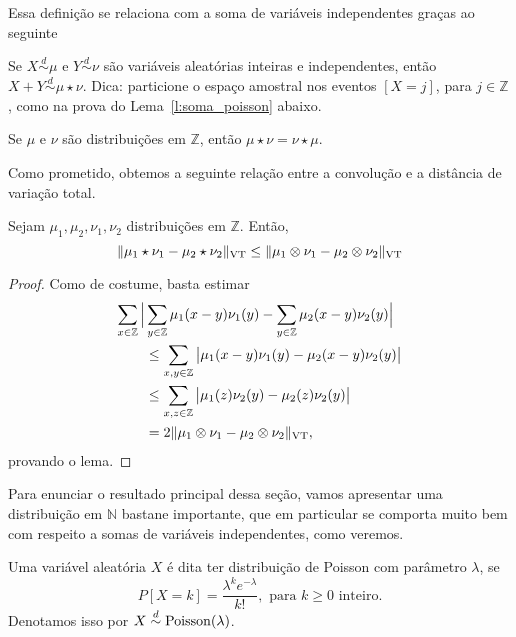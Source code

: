 \begin{topics}
Essa definição se relaciona com a soma de variáveis independentes graças ao seguinte
\begin{exercise}
Se $X \overset{d}\sim \mu$ e $Y \overset{d}\sim \nu$ são variáveis aleatórias inteiras e independentes, então $X + Y \overset{d}\sim \mu \star \nu$.
Dica: particione o espaço amostral nos eventos $[X = j]$, para $j \in \mathbb{Z}$, como na prova do Lema~\ref{l:soma_poisson} abaixo.
\end{exercise}

\begin{corollary}
Se $\mu$ e $\nu$ são distribuições em $\mathbb{Z}$, então $\mu \star \nu = \nu \star \mu$.
\end{corollary}

Como prometido, obtemos a seguinte relação entre a convolução e a distância de  variação total.
\begin{lemma}
\label{l:vt_conv}
Sejam $\mu_1, \mu_2, \nu_1, \nu_2$ distribuições em $\mathbb{Z}$. Então,
\begin{equation}
  \lVert \mu_1 \star \nu_1 - \mu_2 \star \nu_2 \rVert_{\operatorname{VT}} \leq \lVert \mu_1 \otimes \nu_1 - \mu_2 \otimes \nu_2 \rVert_{\operatorname{VT}}
\end{equation}
\end{lemma}

\begin{proof}
Como de costume, basta estimar
\begin{equation}
  \begin{split}
    \sum_{x \in \mathbb{Z}} \Big| & \sum_{y \in \mathbb{Z}} \mu_1(x-y) \nu_1(y) - \sum_{y \in \mathbb{Z}} \mu_2(x-y)\nu_2(y) \Big|\\
    & \leq \sum_{x, y \in \mathbb{Z}} \big| \mu_1(x-y) \nu_1(y) - \mu_2(x-y)\nu_2(y) \big|\\
    & \leq \sum_{x, z \in \mathbb{Z}} \big| \mu_1(z) \nu_2(y) - \mu_2(z)\nu_2(y) \big|\\
    & = 2\lVert \mu_1 \otimes \nu_1 - \mu_2 \otimes \nu_2 \rVert_{\operatorname{VT}},
  \end{split}
\end{equation}
provando o lema.
\end{proof}

Para enunciar o resultado principal dessa seção, vamos apresentar uma distribuição em $\mathbb{N}$ bastane importante, que em particular se comporta muito bem com respeito a somas de variáveis independentes, como veremos.

\begin{definition}
  Uma variável aleatória $X$ é dita ter distribuição de Poisson  com parâmetro $\lambda$, se
  \begin{equation}
    P[X = k] = \frac{\lambda^k e^{-\lambda}}{k!}, \text{ para $k \geq 0$ inteiro.}
  \end{equation}
  Denotamos isso por $X \overset{d}\sim \operatorname{Poisson}(\lambda)$.
\end{definition}


\end{topics}
